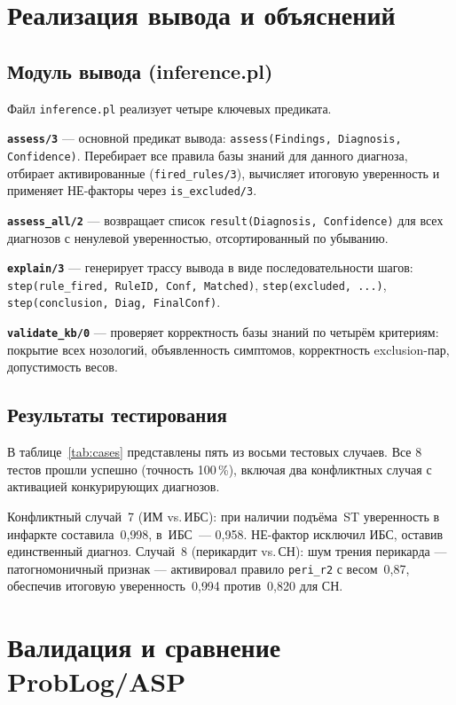\documentclass[14pt,a4paper]{extarticle}
\begin{document}
\section{Реализация вывода и объяснений}

\subsection{Модуль вывода (inference.pl)}

Файл \texttt{inference.pl} реализует четыре ключевых предиката.

\textbf{\texttt{assess/3}} --- основной предикат вывода: \texttt{assess(Findings, Diagnosis, Confidence)}. Перебирает все правила базы знаний для данного диагноза, отбирает активированные (\texttt{fired\_rules/3}), вычисляет итоговую уверенность и применяет НЕ-факторы через \texttt{is\_excluded/3}.

\textbf{\texttt{assess\_all/2}} --- возвращает список \texttt{result(Diagnosis, Confidence)} для всех диагнозов с ненулевой уверенностью, отсортированный по убыванию.

\textbf{\texttt{explain/3}} --- генерирует трассу вывода в виде последовательности шагов: \texttt{step(rule\_fired, RuleID, Conf, Matched)}, \texttt{step(excluded,~...)}, \texttt{step(conclusion, Diag, FinalConf)}.

\textbf{\texttt{validate\_kb/0}} --- проверяет корректность базы знаний по четырём критериям: покрытие всех нозологий, объявленность симптомов, корректность exclusion-пар, допустимость весов.

\subsection{Результаты тестирования}

В таблице~\ref{tab:cases} представлены пять из восьми тестовых случаев. Все 8 тестов прошли успешно (точность 100\,\%), включая два конфликтных случая с активацией конкурирующих диагнозов.



Конфликтный случай~7 (ИМ vs.\,ИБС): при наличии подъёма~ST уверенность в инфаркте составила~0{,}998, в~ИБС~--- 0{,}958. НЕ-фактор исключил ИБС, оставив единственный диагноз. Случай~8 (перикардит vs.\,СН): шум трения перикарда --- патогномоничный признак --- активировал правило \texttt{peri\_r2} с весом~0{,}87, обеспечив итоговую уверенность~0{,}994 против~0{,}820 для СН.

\section{Валидация и сравнение ProbLog/ASP}
\end{document}
